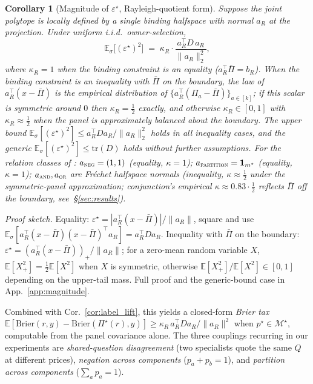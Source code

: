 \documentclass{article}
\theoremstyle{plain}
\newtheorem{corollary}[theorem]{Corollary}
\theoremstyle{definition}
\theoremstyle{remark}
\newcommand{\Mjoint}{\mathcal{M}^{\star}}
\newcommand{\Pijoint}{\Pi^{\star}}
\newcommand{\E}{\mathbb{E}}
\newcommand{\eps}{\varepsilon}
\begin{document}
\begin{corollary}[Magnitude of $\eps^\star$, Rayleigh-quotient form]
\label{cor:magnitude}
Suppose the joint polytope is locally defined by a single binding
halfspace with normal $a_R$ at the projection. Under uniform i.i.d.\
owner-selection,
\begin{equation}
\E_\sigma\!\bigl[(\eps^\star)^2\bigr] \;=\;
\kappa_R \cdot \frac{a_R^\top D\, a_R}{\|a_R\|_2^2},
\label{eq:rayleigh}
\end{equation}
where $\kappa_R = 1$ when the binding constraint is an equality
($a_R^\top \bar\Pi = b_R$). When the binding constraint is an
inequality with $\bar\Pi$ on the boundary, the law of $a_R^\top(x-\bar\Pi)$
is the empirical distribution of $\{a_R^\top(\Pi_a-\bar\Pi)\}_{a\in[k]}$;
if this scalar is symmetric around $0$ then $\kappa_R = \tfrac12$
exactly, and otherwise $\kappa_R \in [0,1]$ with $\kappa_R \approx \tfrac12$
when the panel is approximately balanced about the boundary. The
upper bound $\E_\sigma[(\eps^\star)^2] \le a_R^\top D a_R/\|a_R\|_2^2$
holds in all inequality cases, and the generic
$\E_\sigma[(\eps^\star)^2] \le \mathrm{tr}(D)$ holds without further
assumptions. For the relation classes of \Cref{sec:exp}:
$a_{\textsc{neg}} = (1,1)$ (equality, $\kappa = 1$);
$a_{\textsc{partition}} = \mathbf 1_{m^\star}$ (equality, $\kappa = 1$);
$a_{\textsc{and}}, a_{\textsc{or}}$ are Fr\'echet halfspace normals
(inequality, $\kappa \approx \tfrac12$ under the symmetric-panel
approximation; conjunction's empirical $\kappa\!\approx\!0.83\cdot\tfrac12$
reflects $\bar\Pi$ off the boundary, see~\S\ref{sec:results}).
\end{corollary}

\noindent\emph{Proof sketch.} Equality: $\eps^\star =
|a_R^\top(x-\bar\Pi)|/\|a_R\|$, square and use
$\E_\sigma[a_R^\top(x-\bar\Pi)(x-\bar\Pi)^\top a_R]=a_R^\top D a_R$.
Inequality with $\bar\Pi$ on the boundary: $\eps^\star =
(a_R^\top(x-\bar\Pi))_+/\|a_R\|$; for a zero-mean random variable $X$,
$\E[X_+^2] = \tfrac12 \E[X^2]$ when $X$ is symmetric, otherwise
$\E[X_+^2]/\E[X^2] \in [0,1]$ depending on the upper-tail mass.
Full proof and the generic-bound case in App.~\ref{app:magnitude}.

Combined with Cor.~\ref{cor:label_lift}, this yields a closed-form
\emph{Brier tax}
$\E[\mathrm{Brier}(r,y) - \mathrm{Brier}(\Pijoint(r),y)]
\ge \kappa_R\, a_R^\top D a_R/\|a_R\|^2$ when
$p^\star\!\in\!\Mjoint$, computable from the panel covariance
alone. The three couplings recurring in our experiments are
\emph{shared-question disagreement} (two specialists quote the same
$Q$ at different prices), \emph{negation across components}
($p_a\!+\!p_b\!=\!1$), and \emph{partition across components}
($\sum_a p_a\!=\!1$).
\end{document}

